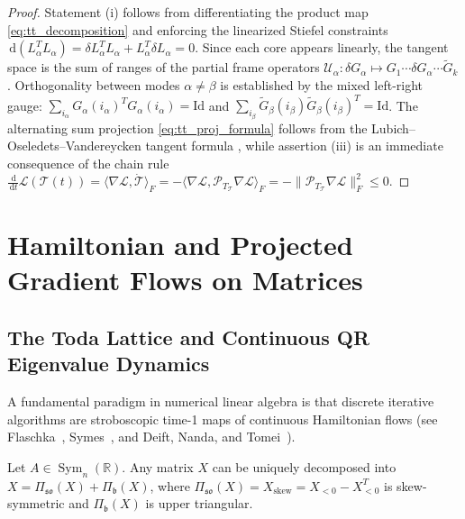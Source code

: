 \documentclass[11pt,a4paper,reqno]{amsart}
\theoremstyle{definition}
\numberwithin{equation}{section}
\providecommand{\R}{\mathbb{R}}
\newcommand{\Id}{\mathrm{Id}}
\newcommand{\dif}{\,\mathrm{d}}
\providecommand{\R}{\mathbb{R}}
\begin{document}
\begin{proof}
Statement (i) follows from differentiating the product map \eqref{eq:tt_decomposition} and enforcing the linearized Stiefel constraints $\dif(L_\alpha^T L_\alpha) = \delta L_\alpha^T L_\alpha + L_\alpha^T \delta L_\alpha = 0$. Since each core appears linearly, the tangent space is the sum of ranges of the partial frame operators $\mathcal{U}_\alpha \colon \delta G_\alpha \mapsto G_1 \cdots \delta G_\alpha \cdots \widetilde{G}_k$. Orthogonality between modes $\alpha \neq \beta$ is established by the mixed left-right gauge: $\sum_{i_\alpha} G_\alpha(i_\alpha)^T G_\alpha(i_\alpha) = \Id$ and $\sum_{i_\beta} \widetilde{G}_\beta(i_\beta) \widetilde{G}_\beta(i_\beta)^T = \Id$. The alternating sum projection \eqref{eq:tt_proj_formula} follows from the Lubich--Oseledets--Vandereycken tangent formula \cite{absil2009optimization}, while assertion (iii) is an immediate consequence of the chain rule $\frac{\dif}{\dif t}\mathcal{L}(\mathcal{T}(t)) = \langle \nabla \mathcal{L}, \dot{\mathcal{T}} \rangle_F = -\langle \nabla \mathcal{L}, \mathcal{P}_{T_{\mathcal{T}}} \nabla \mathcal{L} \rangle_F = -\|\mathcal{P}_{T_{\mathcal{T}}} \nabla \mathcal{L}\|_F^2 \le 0$.
\end{proof}

\section{Hamiltonian and Projected Gradient Flows on Matrices}
\label{sec:gradient_flows}

\subsection{The Toda Lattice and Continuous QR Eigenvalue Dynamics}
A fundamental paradigm in numerical linear algebra is that discrete iterative algorithms are stroboscopic time-1 maps of continuous Hamiltonian flows (see Flaschka~\cite{flaschka1974toda}, Symes~\cite{symes1982qr}, and Deift, Nanda, and Tomei~\cite{deift1983ode}).

Let $A \in \operatorname{Sym}_n(\R)$. Any matrix $X$ can be uniquely decomposed into $X = \Pi_{\mathfrak{so}}(X) + \Pi_{\mathfrak{b}}(X)$, where $\Pi_{\mathfrak{so}}(X) = X_{\mathrm{skew}} = X_{<0} - X_{<0}^T$ is skew-symmetric and $\Pi_{\mathfrak{b}}(X)$ is upper triangular.
\end{document}
